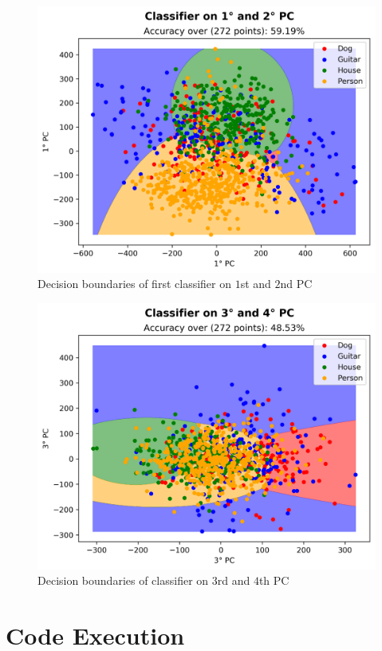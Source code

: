 \documentclass[a4paper, 11pt]{article}
\begin{document}
	\begin{figure}[ht!]
		\centering
		\includegraphics[height=0.52\paperwidth]{img/fig04.png}
		\caption{Decision boundaries of first classifier on $1$st and $2$nd PC}
		\label{fig:class1}
	\end{figure}
	\begin{figure}[ht!]
		\centering
		\includegraphics[height=0.52\paperwidth]{img/fig05.png}
		\caption{Decision boundaries of classifier on $3$rd and $4$th PC}
		\label{fig:class2}
	\end{figure}
	
	
	\section{Code Execution}
\end{document}
